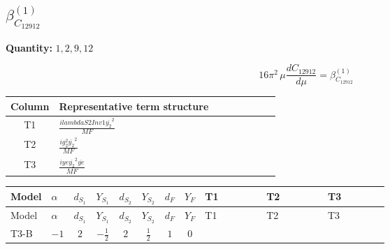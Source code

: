 \documentclass[8pt]{article}
\begin{document}
\begin{landscape}
\section*{$\beta_{C_{12912}}^{(1)}$}
\noindent\textbf{Quantity: }$\mathrm{1,2,9,12}$\par\smallskip
\[16\pi^2\,\mu\frac{d C_{12912}}{d\mu}=\beta_{C_{12912}}^{(1)}\]
\begin{center}
\begin{tabular}{@{}c >{\raggedright\arraybackslash}p{0.82\linewidth}@{}}
\toprule
Column & Representative term structure \\
\midrule
T1 & \(\displaystyle \frac{i lambdaS2Inv1 \overline{y_{2}}^{2}}{MF}\) \\
\midrule
T2 & \(\displaystyle \frac{i g_{2}^{2} \overline{y_{2}}^{2}}{MF}\) \\
\midrule
T3 & \(\displaystyle \frac{i ye \overline{y_{2}}^{2} \overline{ye}}{MF}\) \\
\midrule
\bottomrule
\end{tabular}
\end{center}
\smallskip
\tiny
\begin{longtable}{@{}llcccccc >{\raggedright\arraybackslash}p{0.21\linewidth} >{\raggedright\arraybackslash}p{0.21\linewidth} >{\raggedright\arraybackslash}p{0.21\linewidth}@{}}
\toprule
Model & $\alpha$ & $d_{S_1}$ & $Y_{S_1}$ & $d_{S_2}$ & $Y_{S_2}$ & $d_F$ & $Y_F$ & T1 & T2 & T3 \\
\midrule
\endfirsthead
\toprule
Model & $\alpha$ & $d_{S_1}$ & $Y_{S_1}$ & $d_{S_2}$ & $Y_{S_2}$ & $d_F$ & $Y_F$ & T1 & T2 & T3 \\
\midrule
\endhead
T3-B & $-1$ & $2$ & $-\frac{1}{2}$ & $2$ & $\frac{1}{2}$ & $1$ & $0$ & \scriptsize\adjustbox{max width=\linewidth}{$\begin{gathered} \frac{i lambdaS2Inv1 \overline{y_{2}}^{2}}{4 MF}\end{gathered}$} & \scriptsize\adjustbox{max width=\linewidth}{$\begin{gathered} \frac{3 i g_{2}^{2} \overline{y_{2}}^{2}}{8 MF}\end{gathered}$} & \scriptsize\adjustbox{max width=\linewidth}{$\begin{gathered} - \frac{i ye \overline{y_{2}}^{2} \overline{ye}}{8 MF}\end{gathered}$} \\
\midrule
\bottomrule
\end{longtable}
\clearpage

\end{landscape}
\end{document}
